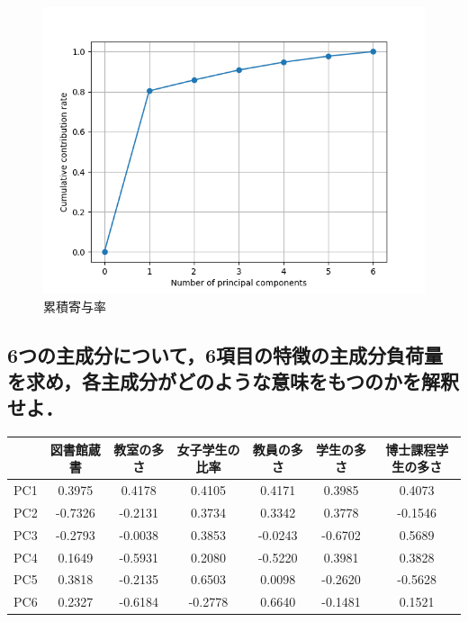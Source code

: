 \documentclass[dvipdfmx,autodetect-engine,titlepage]{jsarticle}
\begin{document}
\begin{figure}[H]
  \centering
  \includegraphics[scale=0.5]{ccr.png}
  \caption{累積寄与率}\label{fig:図2}
\end{figure}

\subsection{6つの主成分について，6項目の特徴の主成分負荷量を求め，各主成分がどのような意味をもつのかを解釈せよ．}

\begin{table}[H]
  \centering
  \begin{tabular}{|c|c|c|c|c|c|c|}
  \hline
      & 図書館蔵書   & 教室の多さ   & 女子学生の比率 & 教員の多さ   & 学生の多さ   & 博士課程学生の多さ \\ \hline
  PC1 & 0.3975  & 0.4178  & 0.4105  & 0.4171  & 0.3985  & 0.4073    \\ \hline
  PC2 & -0.7326 & -0.2131 & 0.3734  & 0.3342  & 0.3778  & -0.1546   \\ \hline
  PC3 & -0.2793 & -0.0038 & 0.3853  & -0.0243 & -0.6702 & 0.5689    \\ \hline
  PC4 & 0.1649  & -0.5931 & 0.2080  & -0.5220 & 0.3981  & 0.3828    \\ \hline
  PC5 & 0.3818  & -0.2135 & 0.6503  & 0.0098  & -0.2620 & -0.5628   \\ \hline
  PC6 & 0.2327  & -0.6184 & -0.2778 & 0.6640  & -0.1481 & 0.1521    \\ \hline
  \end{tabular}
  \end{table}
\end{document}
